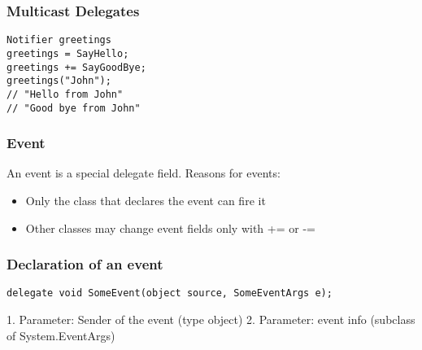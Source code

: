 \subsubsection{Multicast Delegates}
\begin{lstlisting}
Notifier greetings
greetings = SayHello;
greetings += SayGoodBye;
greetings("John");
// "Hello from John"
// "Good bye from John"
\end{lstlisting}

\subsubsection{Event}
An event is a special delegate field. Reasons for events:
\begin{itemize}
  \item Only the class that declares the event can fire it
  \item Other classes may change event fields only with += or -=
\end{itemize}

\subsubsection{Declaration of an event}
\begin{lstlisting}
delegate void SomeEvent(object source, SomeEventArgs e);
\end{lstlisting}
1. Parameter: Sender of the event (type object)
2. Parameter: event info (subclass of System.EventArgs)